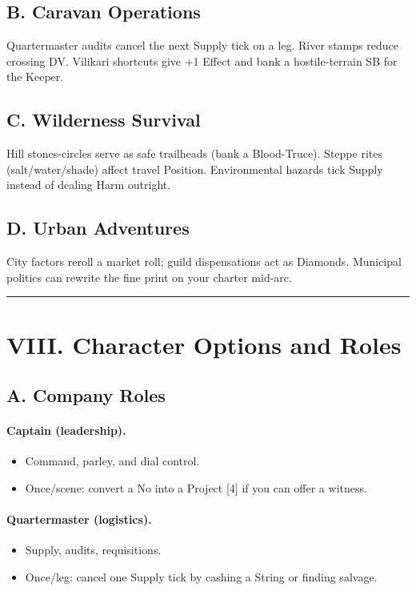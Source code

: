 \documentclass[11pt]{article}
\begin{document}
\subsection*{B. Caravan Operations}

Quartermaster audits cancel the next Supply tick on a leg. River stamps reduce crossing DV. Vilikari shortcuts give +1 Effect and bank a hostile-terrain SB for the Keeper.

\subsection*{C. Wilderness Survival}

Hill stones-circles serve as safe trailheads (bank a Blood-Truce). Steppe rites (salt/water/shade) affect travel Position. Environmental hazards tick Supply instead of dealing Harm outright.

\subsection*{D. Urban Adventures}

City factors reroll a market roll; guild dispensations act as Diamonds. Municipal politics can rewrite the fine print on your charter mid-arc.

\rule{\textwidth}{0.4pt}

\section*{VIII. Character Options and Roles}

\subsection*{A. Company Roles}

\paragraph{Captain (leadership).}
\begin{itemize}
    \item Command, parley, and dial control.
    \item Once/scene: convert a No into a Project [4] if you can offer a witness.
\end{itemize}

\paragraph{Quartermaster (logistics).}
\begin{itemize}
    \item Supply, audits, requisitions.
    \item Once/leg: cancel one Supply tick by cashing a String or finding salvage.
\end{itemize}
\end{document}
